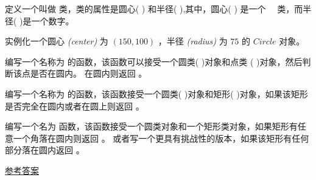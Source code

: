 \begin{exercise}


定义一个叫做 {\em {}} 类，类的属性是圆心( {\em {}} ) 和半径( {\em {}} ),其中，圆心( {\em {}}) 是一个　{\em {}} 类，而半径( {\em {}})是一个数字。


实例化一个圆心 {\em (center)} 为 $(150, 100)$ ，半径 {\em (radius)} 为 $75$ 的 $Circle$ 对象。


编写一个名称为 {\em {}} 的函数，该函数可以接受一个圆类( {\em {}})对象和点类 ( {\em {}} )对象，然后判断该点是否在圆内。 在圆内则返回 {\em {}} 。


编写一个名称为 {\em {}} 的函数，该函数接受一个圆类( {\em {}})对象和矩形( {\em {}})对象，如果该矩形是否完全在圆内或者在圆上则返回 {\em {}} 。


编写一个名为 {\em {}} 函数，该函数接受一个圆类对象和一个矩形类对象，如果矩形有任意一个角落在圆内则返回 {\em {}} 。 或者写一个更具有挑战性的版本，如果该矩形有任何部分落在圆内返回 {\em {}} 。


\href{http://thinkpython2.com/code/Circle.py}{参考答案}

\end{exercise}

